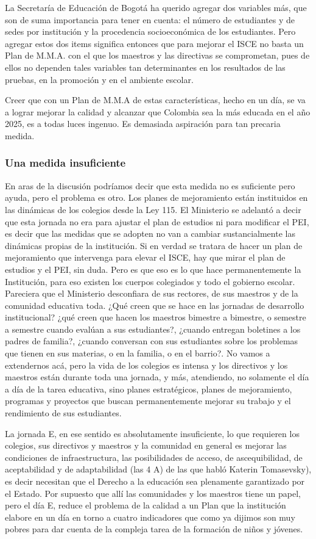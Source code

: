\documentclass[10pt]{article}
\begin{document}
La Secretaría de Educación de Bogotá ha querido agregar dos variables más, que son de suma importancia para tener en cuenta: el número de estudiantes y de sedes por institución y la procedencia socioeconómica de los estudiantes. Pero agregar estos dos items significa entonces que para mejorar el ISCE no basta un Plan de M.M.A. con el que los maestros y las directivas se comprometan, pues de ellos no dependen tales variables tan determinantes en los resultados de las pruebas, en la promoción y en el ambiente escolar.

Creer que con un Plan de M.M.A de estas características, hecho en un día, se va a lograr mejorar la calidad y alcanzar que Colombia sea la más educada en el año 2025, es a todas luces ingenuo. Es demasiada aspiración para tan precaria medida.
\subsubsection*{Una medida insuficiente}
En aras de la discusión podríamos decir que esta medida no es suficiente pero ayuda, pero el problema es otro. Los planes de mejoramiento están instituidos en las dinámicas de los colegios desde la Ley 115. El Ministerio se adelantó a decir que esta jornada no era para ajustar el plan de estudios ni para modificar el PEI, es decir que las medidas que se adopten no van a cambiar sustancialmente las dinámicas propias de la institución. Si en verdad se tratara de hacer un plan de
mejoramiento que intervenga para elevar el ISCE, hay que mirar el plan de estudios y el PEI, sin duda. Pero es que eso es lo que hace permanentemente la Institución, para eso existen los cuerpos colegiados y todo el gobierno escolar. Pareciera que el Ministerio desconfiara de sus rectores, de sus maestros y de la
comunidad educativa toda. ¿Qué creen que se hace en las jornadas de desarrollo institucional? ¿qué creen que hacen los maestros bimestre a bimestre, o semestre a semestre cuando evalúan a sus estudiantes?, ¿cuando entregan boletines a los
padres de familia?, ¿cuando conversan con sus estudiantes sobre los problemas que tienen en sus materias, o en la familia, o en el barrio?. No vamos a extendernos acá, pero la vida de los colegios es intensa y los directivos y los maestros están durante toda una jornada, y más, atendiendo, no solamente el día a día de la tarea educativa, sino planes estratégicos, planes de mejoramiento, programas y proyectos que buscan permanentemente mejorar su trabajo y el rendimiento de sus estudiantes.
 
La jornada E, en ese sentido es absolutamente insuficiente, lo que requieren los colegios, sus directivos y maestros y la comunidad en general es mejorar las condiciones de infraestructura, las posibilidades de acceso, de ascequibilidad, de aceptabilidad y de adaptabilidad (las 4 A) de las que habló Katerin Tomasevsky), es decir necesitan que el Derecho a la educación sea plenamente garantizado por el Estado. Por supuesto que allí las comunidades y los maestros tiene un papel, pero el día E, reduce el problema de la calidad a un Plan que la institución elabore en un día en torno a cuatro indicadores que como ya dijimos son muy pobres para
dar cuenta de la compleja tarea de la formación de niños y jóvenes.
\end{document}
